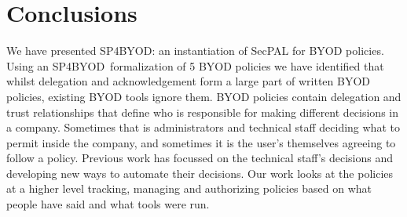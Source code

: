\documentclass{llncs}
\newcommand{\AppPAL}[0]{SP4BYOD}
\begin{document}
% 
% 
% 
% 
% 


\section{Conclusions}
\label{sec:conclusions}

We have presented \AppPAL: an instantiation of SecPAL for BYOD policies.
Using an \AppPAL~formalization of 5 BYOD policies we have identified that whilst delegation and acknowledgement form a large part of written BYOD policies, existing BYOD tools ignore them.
BYOD policies contain delegation and trust relationships that define who is responsible for making different decisions in a company.
Sometimes that is administrators and technical staff deciding what to permit inside the company, and sometimes it is the user's themselves agreeing to follow a policy.
Previous work has focussed on the technical staff's decisions and developing new ways to automate their decisions.
Our work looks at the policies at a higher level tracking, managing and authorizing policies based on what people have said and what tools were run.
\end{document}
